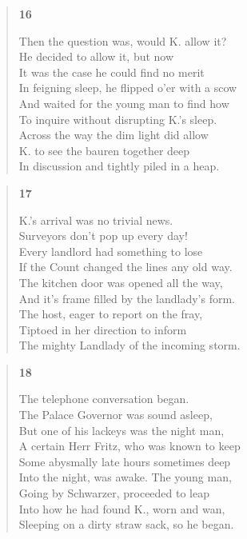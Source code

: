 \documentclass{article}
\begin{document}
\newpage
\begin{verse}
  \begin{center}
    \textbf{16} \\
  \end{center}
  Then the question was, would K. allow it? \\
  He decided to allow it, but now \\
  It was the case he could find no merit \\
  In feigning sleep, he flipped o'er with a scow \\
  And waited for the young man to find how \\
  To inquire without disrupting K.'s sleep. \\
  Across the way the dim light did allow \\
  K. to see the bauren together deep \\
  In discussion and tightly piled in a heap.
\end{verse}
\begin{verse}
  \begin{center}
    \textbf{17} \\
  \end{center}
  K.'s arrival was no trivial news. \\
  Surveyors don't pop up every day! \\
  Every landlord had something to lose \\
  If the Count changed the lines any old way. \\
  The kitchen door was opened all the way, \\
  And it's frame filled by the landlady's form. \\
  The host, eager to report on the fray, \\
  Tiptoed in her direction to inform \\
  The mighty Landlady of the incoming storm.
\end{verse}
\begin{verse}
  \begin{center}
    \textbf{18} \\
  \end{center}
  The telephone conversation began. \\
  The Palace Governor was sound asleep, \\
  But one of his lackeys was the night man, \\
  A certain Herr Fritz, who was known to keep \\
  Some abysmally late hours sometimes deep \\
  Into the night, was awake. The young man, \\
  Going by Schwarzer, proceeded to leap \\
  Into how he had found K., worn and wan, \\
  Sleeping on a dirty straw sack, so he began.
\end{verse}
\end{document}
